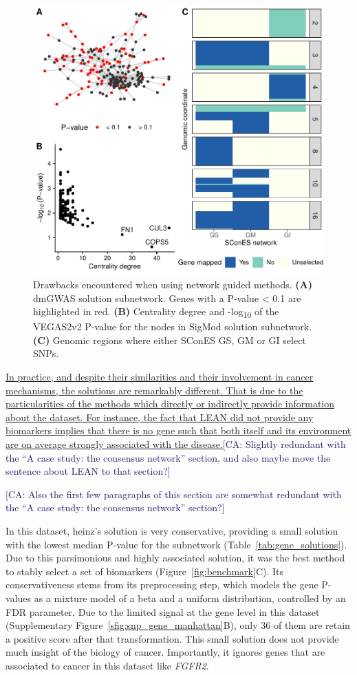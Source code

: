 \documentclass[twocolumn, 11pt]{article}
\newcommand{\cazcom}[2]{{\uline{#1}}\unskip\space\textcolor{MidnightBlue}{[CA: #2]}}
\begin{document}
\begin{figure}[htbp]
\centering
\includegraphics[width=.8\linewidth]{./figures/figure_2.pdf}
\caption{\label{fig:issues}
Drawbacks encountered when using network guided methods. \textbf{(A)} dmGWAS solution subnetwork. Genes with a P-value < 0.1 are highlighted in red. \textbf{(B)} Centrality degree and -log\textsubscript{10} of the VEGAS2v2 P-value for the nodes in SigMod solution subnetwork. \textbf{(C)} Genomic regions where either SConES GS, GM or GI select SNPs.}
\end{figure}

\cazcom{In practice, and despite their similarities and their involvement in cancer mechanisms, the solutions are remarkably different. That is due to the particularities of the methods which directly or indirectly provide information about the dataset. For instance, the fact that LEAN did not provide any biomarkers implies that there is no gene such that both itself and its environment are on average strongly associated with the disease.}{Slightly redundant with the ``A case study: the consensus network'' section, and also maybe move the sentence about LEAN to that section?}

\cazcom{}{Also the first few paragraphs of this section are somewhat redundant with the ``A case study: the consensus network'' section?}

In this dataset, heinz's solution is very conservative, providing a small solution with the lowest median P-value for the subnetwork (Table~\ref{tab:gene_solutions}). Due to this parsimonious and highly associated solution, it was the best method to stably select a set of biomarkers (Figure~\ref{fig:benchmark}C). Its conservativeness stems from its preprocessing step, which models the gene P-values as a mixture model of a beta and a uniform distribution, controlled by an FDR parameter. Due to the limited signal at the gene level in this dataset (Supplementary Figure~\ref{sfig:snp_gene_manhattan}B), only 36 of them are retain a positive score after that transformation. This small solution does not provide much insight of the biology of cancer. Importantly, it ignores genes that are associated to cancer in this dataset like \emph{FGFR2}. 
\end{document}
